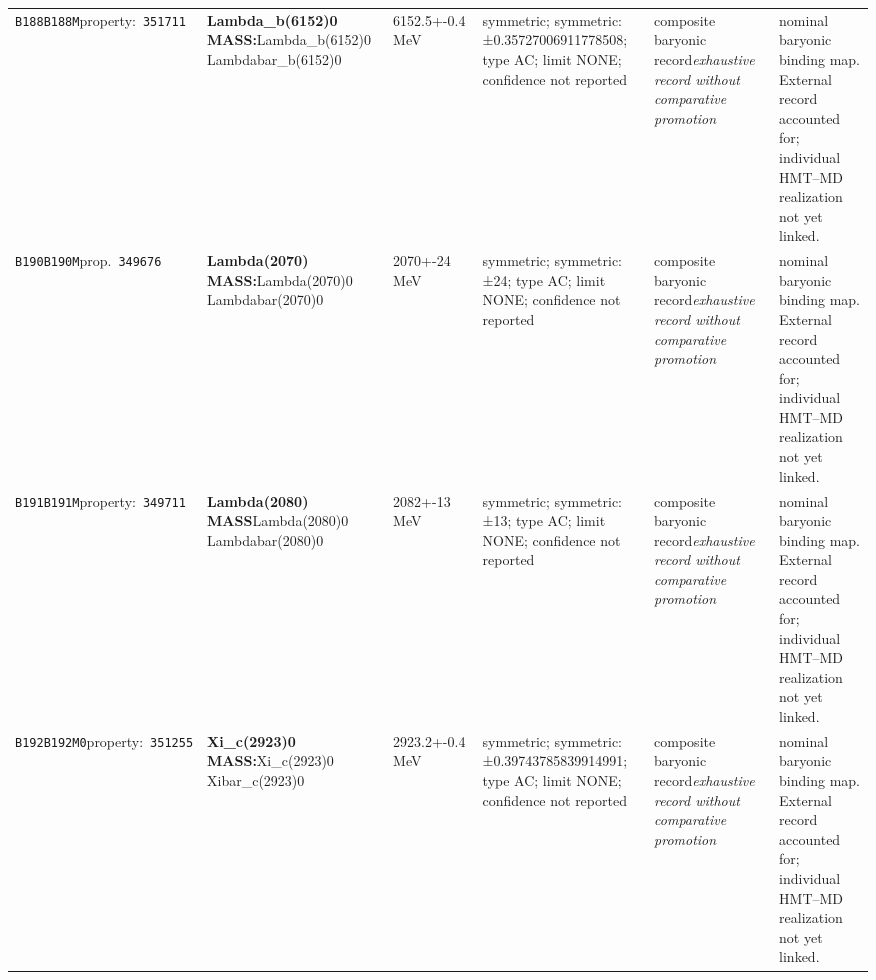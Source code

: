 \begin{landscape}
\begin{longtable}{L{1.85cm}L{4.45cm}L{2.35cm}L{4.05cm}L{3.35cm}L{7.15cm}}
\texttt{B188}\newline \texttt{B188M}\newline property:\ \texttt{351711} & \textbf{Lambda\_\allowbreak{}b(6152)0 MASS:}\newline Lambda\_\allowbreak{}b(6152)0 \textbar{}\allowbreak{} Lambdabar\_\allowbreak{}b(6152)0 & 6152.5+-0.4\,MeV & symmetric; symmetric: ±0.35727006911778508; type AC; limit NONE; confidence not reported & composite baryonic record\newline \emph{exhaustive record without comparative promotion} & nominal baryonic binding map. External record accounted for; individual HMT--MD realization not yet linked. \\
\texttt{B190}\newline \texttt{B190M}\newline prop.\ \texttt{349676} & \textbf{Lambda(2070) MASS:}\newline Lambda(2070)0 \textbar{}\allowbreak{} Lambdabar(2070)0 & 2070+-24\,MeV & symmetric; symmetric: ±24; type AC; limit NONE; confidence not reported & composite baryonic record\newline \emph{exhaustive record without comparative promotion} & nominal baryonic binding map. External record accounted for; individual HMT--MD realization not yet linked. \\
\texttt{B191}\newline \texttt{B191M}\newline property:\ \texttt{349711} & \textbf{Lambda(2080) MASS}\newline Lambda(2080)0 \textbar{}\allowbreak{} Lambdabar(2080)0 & 2082+-13\,MeV & symmetric; symmetric: ±13; type AC; limit NONE; confidence not reported & composite baryonic record\newline \emph{exhaustive record without comparative promotion} & nominal baryonic binding map. External record accounted for; individual HMT--MD realization not yet linked. \\
\texttt{B192}\newline \texttt{B192M0}\newline property:\ \texttt{351255} & \textbf{Xi\_\allowbreak{}c(2923)0 MASS:}\newline Xi\_\allowbreak{}c(2923)0 \textbar{}\allowbreak{} Xibar\_\allowbreak{}c(2923)0 & 2923.2+-0.4\,MeV & symmetric; symmetric: ±0.39743785839914991; type AC; limit NONE; confidence not reported & composite baryonic record\newline \emph{exhaustive record without comparative promotion} & nominal baryonic binding map. External record accounted for; individual HMT--MD realization not yet linked. \\

\end{longtable}
\end{landscape}
